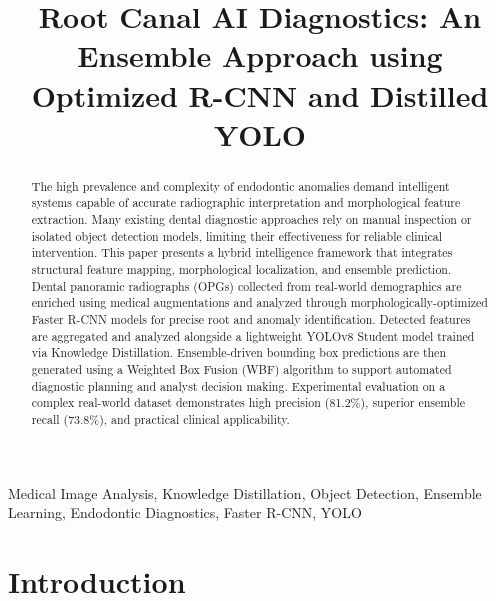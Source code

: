 \documentclass[conference]{IEEEtran}
\begin{document}
\title{Root Canal AI Diagnostics: An Ensemble Approach using Optimized R-CNN and Distilled YOLO}

\author{
}

\maketitle

\begin{abstract}
The high prevalence and complexity of endodontic anomalies demand intelligent systems capable of accurate radiographic interpretation and morphological feature extraction. Many existing dental diagnostic approaches rely on manual inspection or isolated object detection models, limiting their effectiveness for reliable clinical intervention. This paper presents a hybrid intelligence framework that integrates structural feature mapping, morphological localization, and ensemble prediction. Dental panoramic radiographs (OPGs) collected from real-world demographics are enriched using medical augmentations and analyzed through morphologically-optimized Faster R-CNN models for precise root and anomaly identification. Detected features are aggregated and analyzed alongside a lightweight YOLOv8 Student model trained via Knowledge Distillation. Ensemble-driven bounding box predictions are then generated using a Weighted Box Fusion (WBF) algorithm to support automated diagnostic planning and analyst decision making. Experimental evaluation on a complex real-world dataset demonstrates high precision (81.2\%), superior ensemble recall (73.8\%), and practical clinical applicability.
\end{abstract}

\begin{IEEEkeywords}
Medical Image Analysis, Knowledge Distillation, Object Detection, Ensemble Learning, Endodontic Diagnostics, Faster R-CNN, YOLO
\end{IEEEkeywords}

\section{Introduction}
\end{document}
